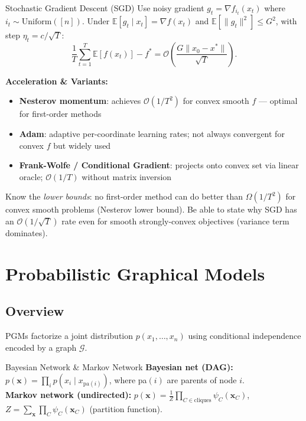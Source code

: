 \documentclass[10pt, letterpaper]{article}
\newcommand{\term}[1]{\textbf{\color{accent}#1}}
\newcommand{\E}{\mathbb{E}}
\newcommand{\bigO}[1]{\mathcal{O}\!\left(#1\right)}
\begin{document}
\begin{defbox}{Stochastic Gradient Descent (SGD)}
Use noisy gradient $g_t = \nabla f_{i_t}(x_t)$ where $i_t \sim \text{Uniform}([n])$.
Under $\E[g_t\mid x_t]=\nabla f(x_t)$ and $\E[\|g_t\|^2]\le G^2$, with step
$\eta_t = c/\sqrt{T}$:
\[
  \frac{1}{T}\sum_{t=1}^T \E[f(x_t)] - f^* = \bigO{\frac{G\|x_0-x^*\|}{\sqrt{T}}}.
\]
\end{defbox}

\textbf{Acceleration \& Variants:}
\begin{itemize}
  \item \term{Nesterov momentum}: achieves $\bigO{1/T^2}$ for convex smooth $f$ —
        optimal for first-order methods
  \item \term{Adam}: adaptive per-coordinate learning rates; not always convergent
        for convex $f$ but widely used
  \item \term{Frank-Wolfe / Conditional Gradient}: projects onto convex set via
        linear oracle; $\bigO{1/T}$ without matrix inversion
\end{itemize}

\begin{examtip}
Know the \emph{lower bounds}: no first-order method can do better than
$\Omega(1/T^2)$ for convex smooth problems (Nesterov lower bound). Be able to
state why SGD has an $\bigO{1/\sqrt{T}}$ rate even for smooth strongly-convex
objectives (variance term dominates).
\end{examtip}

\section{Probabilistic Graphical Models}

\subsection{Overview}
PGMs factorize a joint distribution $p(x_1,\ldots,x_n)$ using conditional
independence encoded by a graph $\mathcal{G}$.

\begin{defbox}{Bayesian Network \& Markov Network}
\textbf{Bayesian net (DAG):}
$p(\mathbf{x}) = \prod_{i} p(x_i \mid x_{\mathrm{pa}(i)})$, where pa$(i)$ are
parents of node $i$. \\[2pt]
\textbf{Markov network (undirected):}
$p(\mathbf{x}) = \frac{1}{Z}\prod_{C\in\mathrm{cliques}} \psi_C(\mathbf{x}_C)$,\quad
$Z = \sum_{\mathbf{x}}\prod_C \psi_C(\mathbf{x}_C)$ (partition function).
\end{defbox}
\end{document}
